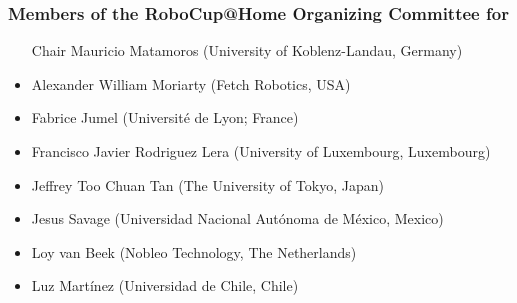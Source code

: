 \subsubsection{Members of the RoboCup@Home Organizing Committee for \YEAR}

\begin{itemize}
  \item[Chair] Mauricio Matamoros (University of Koblenz-Landau, Germany)
  \item Alexander William Moriarty (Fetch Robotics, USA)
  \item Fabrice Jumel (Université de Lyon; France)
  \item Francisco Javier Rodriguez Lera (University of Luxembourg, Luxembourg)
  \item Jeffrey Too Chuan Tan (The University of Tokyo, Japan)
  \item Jesus Savage (Universidad Nacional Autónoma de México, Mexico)
  \item Loy van Beek (Nobleo Technology, The Netherlands)
  \item Luz Martínez (Universidad de Chile, Chile)
\end{itemize}
